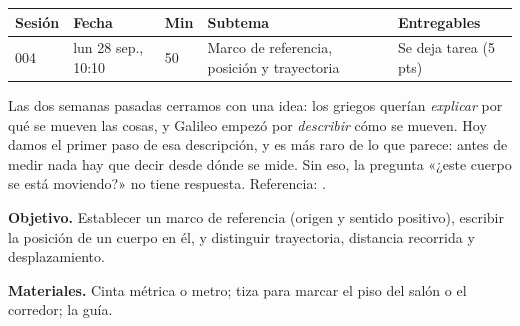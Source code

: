 \documentclass[11pt]{article}
\begin{document}
\encabezado*

\begin{center}
{\renewcommand{\arraystretch}{1.3}
\begin{tabularx}{\linewidth}{@{}l l l X l@{}}
  \toprule
  \textbf{Sesión} & \textbf{Fecha} & \textbf{Min} & \textbf{Subtema} & \textbf{Entregables}\\
  \midrule
  004 & lun 28 sep., 10:10 & 50 & Marco de referencia, posición y trayectoria
      & Se deja tarea (5 pts)\\
  \bottomrule
\end{tabularx}}
\end{center}

Las dos semanas pasadas cerramos con una idea: los griegos querían \emph{explicar} por qué se
mueven las cosas, y Galileo empezó por \emph{describir} cómo se mueven. Hoy damos el primer
paso de esa descripción, y es más raro de lo que parece: antes de medir nada hay que decir
desde dónde se mide. Sin eso, la pregunta «¿este cuerpo se está moviendo?» no tiene respuesta.
Referencia: .


\textbf{Objetivo.} Establecer un marco de referencia (origen y sentido positivo), escribir la
posición de un cuerpo en él, y distinguir trayectoria, distancia recorrida y desplazamiento.

\textbf{Materiales.} Cinta métrica o metro; tiza para marcar el piso del salón o el corredor;
la guía.
\end{document}
